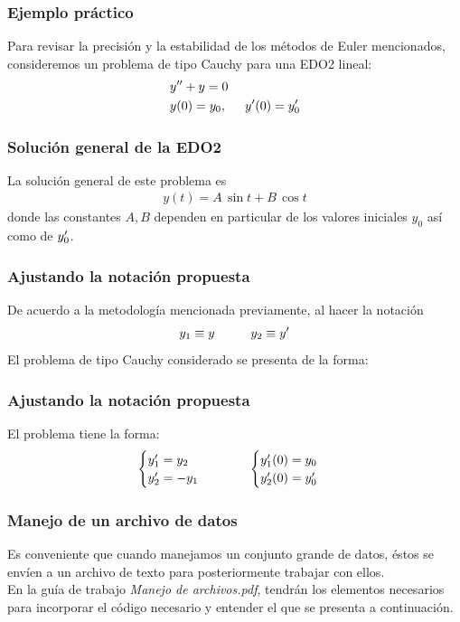 \begin{frame}
\frametitle{Ejemplo práctico}
Para revisar la precisión y la estabilidad de los métodos de Euler mencionados, consideremos un problema de tipo Cauchy para una EDO2 lineal:
\begin{align}
&{y}^{\prime \prime} + y = 0 \label{eq:ecuacion_12_19} \\
&y(0) = y_{0}, \hspace{0.5cm} {y}^{\prime}(0) = {y}^{\prime}_{0} \label{eq:ecuacion_12_20}
\end{align}
\end{frame}
\begin{frame}
\frametitle{Solución general de la EDO2}
La solución general de este problema es
\begin{align*}
y(t) =  A \, \sin t +  B \, \cos t
\end{align*}
\pause
donde las constantes $A, B$ dependen en particular de los valores iniciales $y_{0}$ así como de ${y}^{\prime}_{0}$.
\end{frame}
\begin{frame}
\frametitle{Ajustando la notación propuesta}
De acuerdo a la metodología mencionada previamente, al hacer la notación
\begin{align*}
y_{1} \equiv y \hspace{1cm} y_{2} \equiv {y}^{\prime}
\end{align*}
El problema de tipo Cauchy considerado se presenta de la forma:
\end{frame}
\begin{frame}
\frametitle{Ajustando la notación propuesta}
El problema tiene la forma:
\begin{align}
\begin{cases}
{y}^{\prime}_{1} = y_{2} \\
{y}^{\prime}_{2} = - y_{1}
\end{cases}
\hspace{1cm}
\begin{cases}
{y}^{\prime}_{1}(0) = y_{0} \\
{y}^{\prime}_{2}(0) = {y}^{\prime}_{0}
\end{cases}
\label{eq:ecuacion_12_21}
\end{align}
\end{frame}
\begin{frame}
\frametitle{Manejo de un archivo de datos}
Es conveniente que cuando manejamos un conjunto grande de datos, éstos se envíen a un archivo de texto para posteriormente trabajar con ellos.
\\
\bigskip
En la guía de trabajo \emph{Manejo de archivos.pdf}, tendrán los elementos necesarios para incorporar el código necesario y entender el que se presenta a continuación.
\end{frame}

